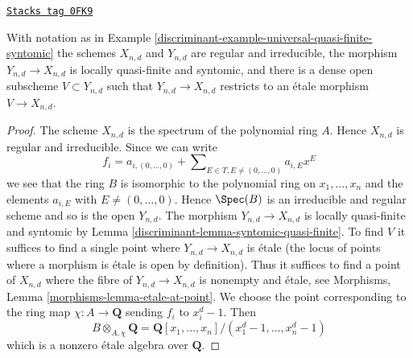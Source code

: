 \begin{lemma}
\label{discriminant-lemma-universal-quasi-finite-syntomic-etale}
\href{https://stacks.math.columbia.edu/tag/0FK9}{\texttt{Stacks tag 0FK9}}

With notation as in Example \ref{discriminant-example-universal-quasi-finite-syntomic}
the schemes $X_{n, d}$ and $Y_{n, d}$ are regular and irreducible,
the morphism $Y_{n, d} \to X_{n, d}$ is locally quasi-finite and
syntomic, and there is a dense open subscheme $V \subset Y_{n, d}$
such that $Y_{n, d} \to X_{n, d}$ restricts to an \'etale morphism
$V \to X_{n, d}$.
\end{lemma}

\begin{proof}

The scheme $X_{n, d}$ is the spectrum of the polynomial ring $A$.
Hence $X_{n, d}$ is regular and irreducible. Since we can write
$$
f_i = a_{i, (0, \ldots, 0)} +
\sum\nolimits_{E \in T, E \not = (0, \ldots, 0)} a_{i, E} x^E
$$
we see that the ring $B$ is isomorphic to the polynomial ring
on $x_1, \ldots, x_n$ and the elements $a_{i, E}$ with
$E \not = (0, \ldots, 0)$. Hence $\Spec(B)$ is an irreducible and
regular scheme and so is the open $Y_{n, d}$. The morphism
$Y_{n, d} \to X_{n, d}$ is locally quasi-finite and syntomic by
Lemma \ref{discriminant-lemma-syntomic-quasi-finite}. To find $V$ it suffices
to find a single point where $Y_{n, d} \to X_{n, d}$ is \'etale
(the locus of points where a morphism is \'etale is open by
definition). Thus it suffices to find a point of $X_{n, d}$
where the fibre of $Y_{n, d} \to X_{n, d}$ is nonempty and \'etale, see
Morphisms, Lemma \ref{morphisms-lemma-etale-at-point}. We choose
the point corresponding to the ring map $\chi : A \to \mathbf{Q}$
sending $f_i$ to $x_i^d - 1$. Then
$$
B \otimes_{A, \chi} \mathbf{Q} =
\mathbf{Q}[x_1, \ldots, x_n]/(x_1^d - 1, \ldots, x_n^d - 1)
$$
which is a nonzero \'etale algebra over $\mathbf{Q}$.
\end{proof}

